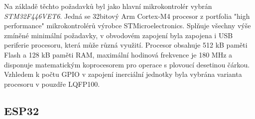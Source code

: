 Na základě těchto požadavků byl jako hlavní mikrokontrolér vybrán \emph{STM32F446VET6}. Jedná se 32bitový Arm Cortex-M4 procesor z portfolia "high performance" mikrokontrolérů výrobce STMicroelectronics. Splňuje všechny výše zmíněné minimální požadavky, v obvodovém zapojení byla zapojena i USB periferie procesoru, která může různá využití. Procesor obsahuje 512 kB paměti Flash a 128 kB paměti RAM, maximální hodinová frekvence je 180 MHz a disponuje matematickým koprocesorem pro operace s plovoucí desetinou čárkou. Vzhledem k počtu GPIO v zapojení inerciální jednotky byla vybrána varianta procesoru v pouzdře LQFP100. \cite{csdGtKJDMSdbwJ9r}

\subsection{ESP32}




